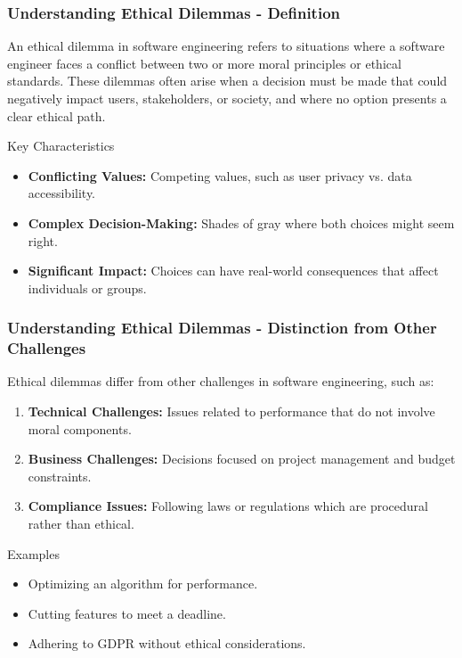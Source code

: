 \documentclass{beamer}
\begin{document}
\begin{frame}[fragile]
    \frametitle{Understanding Ethical Dilemmas - Definition}
    An ethical dilemma in software engineering refers to situations where a software engineer faces a conflict between two or more moral principles or ethical standards. 
    These dilemmas often arise when a decision must be made that could negatively impact users, stakeholders, or society, and where no option presents a clear ethical path.
    
    \begin{block}{Key Characteristics}
        \begin{itemize}
            \item \textbf{Conflicting Values:} Competing values, such as user privacy vs. data accessibility.
            \item \textbf{Complex Decision-Making:} Shades of gray where both choices might seem right.
            \item \textbf{Significant Impact:} Choices can have real-world consequences that affect individuals or groups.
        \end{itemize}
    \end{block}
\end{frame}

\begin{frame}[fragile]
    \frametitle{Understanding Ethical Dilemmas - Distinction from Other Challenges}
    Ethical dilemmas differ from other challenges in software engineering, such as:
    
    \begin{enumerate}
        \item \textbf{Technical Challenges:} Issues related to performance that do not involve moral components.
        \item \textbf{Business Challenges:} Decisions focused on project management and budget constraints.
        \item \textbf{Compliance Issues:} Following laws or regulations which are procedural rather than ethical.
    \end{enumerate}
    
    \begin{block}{Examples}
        \begin{itemize}
            \item Optimizing an algorithm for performance.
            \item Cutting features to meet a deadline.
            \item Adhering to GDPR without ethical considerations.
        \end{itemize}
    \end{block}
\end{frame}
\end{document}
